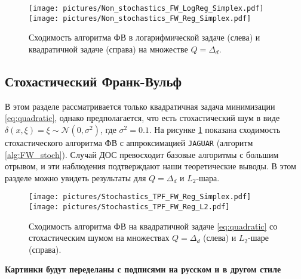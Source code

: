     \begin{figure}[H]
        \begin{center}
            \texttt{[image: pictures/Non\_stochastics\_FW\_LogReg\_Simplex.pdf]}
            \texttt{[image: pictures/Non\_stochastics\_FW\_Reg\_Simplex.pdf]}
            \caption{Сходимость алгоритма ФВ в логарифмической задаче (слева) и квадратичной задаче (справа) на множестве $Q = \Delta_d$.}
            \label{fig:FW_determ}
        \end{center}
    \end{figure}
    
    
\subsection{Стохастический Франк-Вульф}

    В этом разделе рассматривается только квадратичная задача минимизации \eqref{eq:quadratic}, однако предполагается, что есть стохастический шум в виде $\delta(x, \xi) = \xi \sim \mathcal{N}(0, \sigma^2)$, где $\sigma^2 = 0.1$. На рисунке \ref{fig:FW_determ} показана сходимость стохастического алгоритма ФВ с аппроксимацией \texttt{JAGUAR} (алгоритм \ref{alg:FW_stoch}). Случай ДОС превосходит базовые алгоритмы с большим отрывом, и эти наблюдения подтверждают наши теоретические выводы.
    В этом разделе можно увидеть результаты для $Q = \Delta_d$ и $L_2$-шара.

    \begin{figure}[H]
        \centering
            \texttt{[image: pictures/Stochastics\_TPF\_FW\_Reg\_Simplex.pdf]}
            \texttt{[image: pictures/Stochastics\_TPF\_FW\_Reg\_L2.pdf]}
            \caption{Сходимость алгоритма ФВ на квадратичной задаче \eqref{eq:quadratic} со стохастическим шумом на множествах $Q = \Delta_d$ (слева) и $L_2$-шаре (справа).}
        \label{fig:FW_stoch}
    \end{figure}

\textbf{Картинки будут переделаны с подписями на русском и в другом стиле}